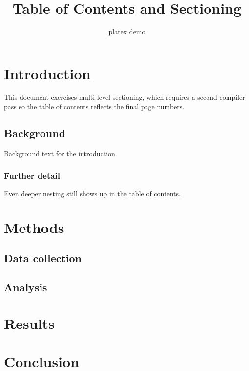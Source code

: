 \documentclass{article}
\title{Table of Contents and Sectioning}
\author{platex demo}
\date{}
\begin{document}
\maketitle
\tableofcontents

\section{Introduction}
This document exercises multi-level sectioning, which requires a second
compiler pass so the table of contents reflects the final page numbers.

\subsection{Background}
Background text for the introduction.

\subsubsection{Further detail}
Even deeper nesting still shows up in the table of contents.

\section{Methods}
\subsection{Data collection}
\subsection{Analysis}

\section{Results}

\section{Conclusion}
\end{document}
